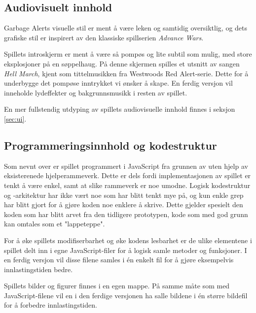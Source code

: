 \subsection{Audiovisuelt innhold}
Garbage Alerts visuelle stil er ment å være leken og samtidig oversiktlig, og dets grafiske stil er inspirert av den klassiske spillserien \emph{Advance Wars}\cite{game:advancewars}.

Spillets introskjerm er ment å være så pompøs og lite subtil som mulig, med store eksplosjoner på en søppelhaug. På denne skjermen spilles et utsnitt av sangen \emph{Hell March}, kjent som tittelmusikken fra Westwoods Red Alert-serie\cite{game:redalert}. Dette for å underbygge det pompøse inntrykket vi ønsker å skape. En ferdig versjon vil inneholde lydeffekter og bakgrunnsmusikk i resten av spillet.

En mer fullstendig utdyping av spillets audiovisuelle innhold finnes i seksjon \ref{sec:ui}.



\subsection{Programmeringsinnhold og kodestruktur}
Som nevnt over er spillet programmert i JavaScript fra grunnen av uten hjelp av eksisterenede hjelperammeverk. Dette er dels fordi implementasjonen av spillet er tenkt å være enkel, samt at slike rammeverk er noe umodne.
Logisk kodestruktur og -arkitektur har ikke vært noe som har blitt tenkt mye på, og kun enkle grep har blitt gjort for å gjøre koden noe enklere å skrive. Dette gjelder spesielt den koden som har blitt arvet fra den tidligere prototypen, kode som med god grunn kan omtales som et "lappeteppe".

For å øke spillets modifiserbarhet og øke kodens lesbarhet er de ulike elementene i spillet delt inn i egne JavaScript-filer for å logisk samle metoder og funksjoner. I en ferdig versjon vil disse filene samles i én enkelt fil for å gjøre eksempelvis innlastingstiden bedre.

Spillets bilder og figurer finnes i en egen mappe. På samme måte som med JavaScript-filene vil en i den ferdige versjonen ha salle bildene i én større bildefil for å forbedre innlastingstiden.


